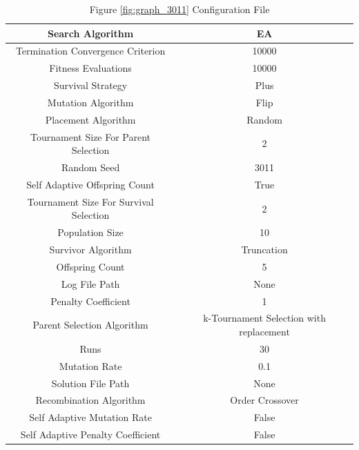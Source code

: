 \documentclass{standalone}
\begin{document}
\clearpage
\begin{table}[!htb]
	\centering
	\caption{Figure \ref{fig:graph_3011} Configuration File}
	\label{tab:graph_3011}
	\begin{tabular}{| c | c |}
		\hline
		Search Algorithm		& EA		 \\
		\hline
		Termination Convergence Criterion		& 10000		 \\
		\hline
		Fitness Evaluations		& 10000		 \\
		\hline
		Survival Strategy		& Plus		 \\
		\hline
		Mutation Algorithm		& Flip		 \\
		\hline
		Placement Algorithm		& Random		 \\
		\hline
		Tournament Size For Parent Selection		& 2		 \\
		\hline
		Random Seed		& 3011		 \\
		\hline
		Self Adaptive Offspring Count		& True		 \\
		\hline
		Tournament Size For Survival Selection		& 2		 \\
		\hline
		Population Size		& 10		 \\
		\hline
		Survivor Algorithm		& Truncation		 \\
		\hline
		Offspring Count		& 5		 \\
		\hline
		Log File Path		& None		 \\
		\hline
		Penalty Coefficient		& 1		 \\
		\hline
		Parent Selection Algorithm		& k-Tournament Selection with replacement		 \\
		\hline
		Runs		& 30		 \\
		\hline
		Mutation Rate		& 0.1		 \\
		\hline
		Solution File Path		& None		 \\
		\hline
		Recombination Algorithm		& Order Crossover		 \\
		\hline
		Self Adaptive Mutation Rate		& False		 \\
		\hline
		Self Adaptive Penalty Coefficient		& False		 \\
		\hline
	\end{tabular}
\end{table}
\end{document}
